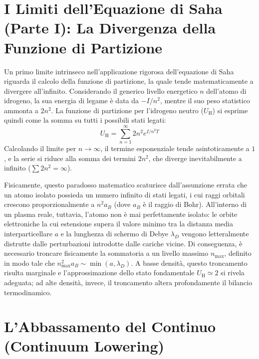 \section{I Limiti dell'Equazione di Saha (Parte I): La Divergenza della Funzione di Partizione}

Un primo limite intrinseco nell'applicazione rigorosa dell'equazione di Saha riguarda il calcolo della funzione di partizione, la quale tende matematicamente a divergere all'infinito. Considerando il generico livello energetico $n$ dell'atomo di idrogeno, la sua energia di legame è data da $-I/n^2$, mentre il suo peso statistico ammonta a $2n^2$. La funzione di partizione per l'idrogeno neutro ($U_{\text{H}}$) si esprime quindi come la somma su tutti i possibili stati legati:
\begin{equation}
U_{\text{H}} = \sum_{n=1}^\infty 2n^2 e^{I/n^2 T}
\end{equation}
Calcolando il limite per $n \to \infty$, il termine esponenziale tende asintoticamente a $1$, e la serie si riduce alla somma dei termini $2n^2$, che diverge inevitabilmente a infinito ($\sum 2n^2 = \infty$).

Fisicamente, questo paradosso matematico scaturisce dall'assunzione errata che un atomo isolato possieda un numero infinito di stati legati, i cui raggi orbitali crescono proporzionalmente a $n^2 a_B$ (dove $a_B$ è il raggio di Bohr). All'interno di un plasma reale, tuttavia, l'atomo non è mai perfettamente isolato: le orbite elettroniche la cui estensione supera il valore minimo tra la distanza media interparticellare $a$ e la lunghezza di schermo di Debye $\lambda_D$ vengono letteralmente distrutte dalle perturbazioni introdotte dalle cariche vicine. Di conseguenza, è necessario troncare fisicamente la sommatoria a un livello massimo $n_{\text{max}}$, definito in modo tale che $n_{\text{max}}^2 a_B \sim \min(a, \lambda_D)$. A basse densità, questo troncamento risulta marginale e l'approssimazione dello stato fondamentale $U_{\text{H}} \simeq 2$ si rivela adeguata; ad alte densità, invece, il troncamento altera profondamente il bilancio termodinamico.

\section{L'Abbassamento del Continuo (Continuum Lowering)}

